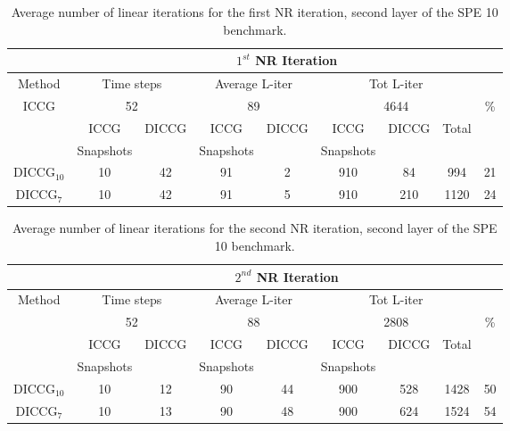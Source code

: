 \documentclass[12pt]{article}
\begin{document}
\begin{table}[!ht]\centering
\begin{minipage}{1\textwidth}
\vspace{-10pt}
\centering
\begin{tabular}{ |c|c|c|c|c|c|c|c|c|} 
  \hline
  & \multicolumn{8}{|c|}{$1^{st}$ NR Iteration}  \\
\hline
Method&  \multicolumn{2}{|c|}{Time steps} &\multicolumn{2}{|c|}{Average L-iter} & \multicolumn{3}{|c|}{Tot L-iter}&\\
\hline
 ICCG&\multicolumn{2}{|c|}{52} & \multicolumn{2}{|c|}{89}& \multicolumn{3}{|c|}{4644} &\%\\
\hline
&ICCG&DICCG&ICCG&DICCG&ICCG&DICCG&Total&\\
&Snapshots&&Snapshots&&Snapshots&&&\\
\hline
DICCG$_{10}$&10&42&91&2&910&84&994&21 \\
DICCG$_7$ &10&42&91&5&910&210&1120&24  \\
\hline
 \end{tabular}
\caption{Average number of linear iterations for the first NR iteration, second layer of the SPE 10 benchmark.}\label{table:literspe1}
\end{minipage}
\end{table}


\begin{table}[!ht]\centering
\begin{minipage}{1\textwidth}
\vspace{-10pt}
\centering
\begin{tabular}{ |c|c|c|c|c|c|c|c|c|} 
  \hline
  & \multicolumn{8}{|c|}{$2^{nd}$ NR Iteration}  \\
\hline
Method&  \multicolumn{2}{|c|}{Time steps} &\multicolumn{2}{|c|}{Average L-iter} & \multicolumn{3}{|c|}{Tot L-iter}&\\
\hline
 &\multicolumn{2}{|c|}{52} & \multicolumn{2}{|c|}{88}& \multicolumn{3}{|c|}{2808} &\%\\
\hline
&ICCG&DICCG&ICCG&DICCG&ICCG&DICCG&Total&\\
&Snapshots&&Snapshots&&Snapshots&&&\\
\hline
DICCG$_{10}$&10&12&90&44&900&528&1428&50 \\
DICCG$_7$ &10&13&90&48&900&624&1524&54  \\
\hline
 \end{tabular}
\caption{Average number of linear iterations for the second NR iteration, second layer of the SPE 10 benchmark.}\label{table:literspe2}
\end{minipage}
\end{table}
\end{document}
